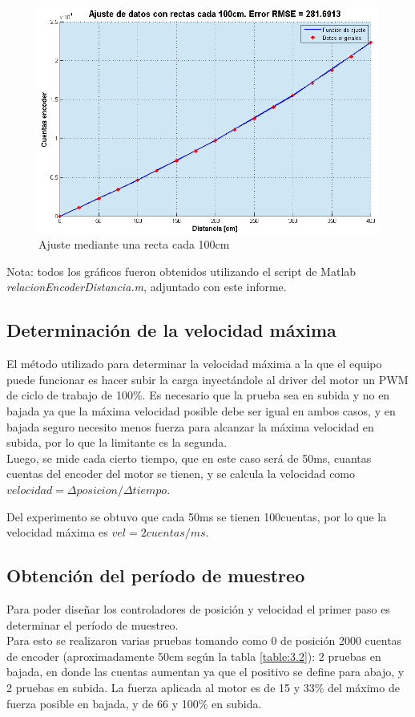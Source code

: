 \begin{figure}[!ht]
	\centering
	\includegraphics[width=15cm,scale=1]{resources/3_13-ajusteRectas100cm.png}
	\caption{Ajuste mediante una recta cada 100cm}
	\label{fig:\thefigure}
\end{figure}

\textcolor{FIXME}{Nota: todos los gráficos fueron obtenidos utilizando el script de Matlab \textit{relacionEncoderDistancia.m}, adjuntado con este informe.}

\subsection{Determinación de la velocidad máxima}
El método utilizado para determinar la velocidad máxima a la que el equipo puede funcionar es hacer subir la carga inyectándole al driver del  motor un PWM de ciclo de trabajo de 100\%. Es necesario que la prueba sea en subida y no en bajada ya que la máxima velocidad posible debe ser igual en ambos casos, y en bajada seguro necesito menos fuerza para alcanzar la máxima velocidad en subida, por lo que la limitante es la segunda. \\
Luego, se mide cada cierto tiempo, que en este caso será de 50ms, cuantas cuentas del encoder del motor se tienen, y se calcula la velocidad como \(velocidad = \Delta posicion/\Delta tiempo \).

Del experimento se obtuvo que cada 50ms se tienen 100cuentas, por lo que la velocidad máxima es \(vel = 2cuentas/ms\).

\subsection{Obtención del período de muestreo}
Para poder diseñar los controladores de posición y velocidad el primer paso es determinar el período de muestreo. \\
Para esto se realizaron varias pruebas tomando como 0 de posición 2000 cuentas de encoder (aproximadamente 50cm según la tabla \ref{table:3.2}): 2 pruebas en bajada, en donde las cuentas aumentan ya que el positivo se define para abajo, y 2 pruebas en subida. La fuerza aplicada al motor es de 15 y 33\% del máximo de fuerza posible en bajada, y de 66 y 100\% en subida.



